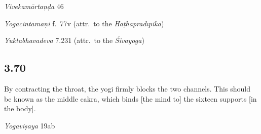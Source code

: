 \begin{ekdosis}
\begin{sources}[hp03_069]
\emph{Vivekamārtaṇḍa} 46
\begin{versinnote}
\tl{\var{pradhāvati ] ; prakupyati AGT}\\!}
\end{versinnote}
\end{sources}

\begin{testimonia}[hp03_069]
\emph{Yogacintāmaṇi} f.~77v (attr.~to the \emph{Haṭhapradīpikā})
\begin{versinnote}
\end{versinnote}

\emph{Yuktabhavadeva} 7.231 (attr.~to the \emph{Śivayoga})
\begin{versinnote}
\end{versinnote}
\end{testimonia}



\subsection*{3.70}
\begin{translation}[hp03_070]
By contracting the throat, the yogi firmly blocks the two channels. This should be known as the middle cakra, which binds [the mind to] the sixteen supports [in the body].
\end{translation}


\begin{testimonia}[hp03_070]
\emph{Yogaviṣaya} 19ab %
\begin{versinnote}
\end{versinnote}


\end{testimonia}
\end{ekdosis}
